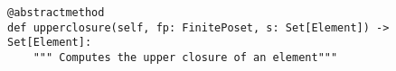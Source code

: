 \par\begin{minipage}{73ex}
\begin{verbatim}
@abstractmethod
def upperclosure(self, fp: FinitePoset, s: Set[Element]) -> Set[Element]:
    """ Computes the upper closure of an element"""
\end{verbatim}
\end{minipage}\par